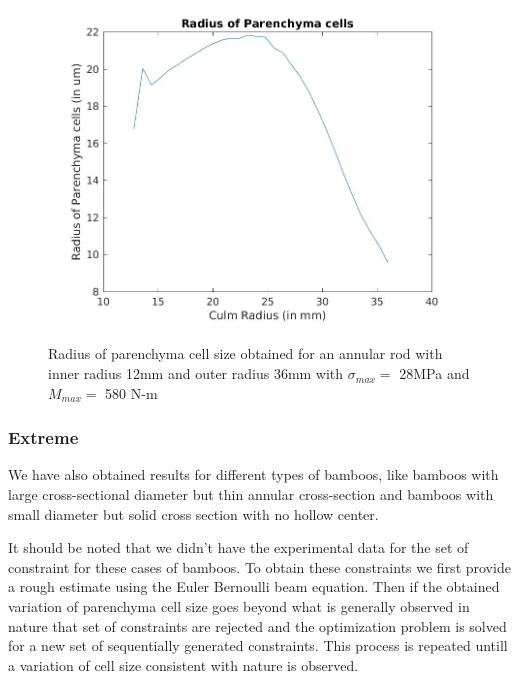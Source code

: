 \documentclass[10pt]{article}
\begin{document}
\begin{figure}[H]
\begin{center}
	\includegraphics[scale=0.4]{./Plots/normal/b77.jpg}
	\label{fig:cellsize}
	\caption{Radius of parenchyma cell size obtained for an annular rod with inner radius 12mm and outer radius 36mm with $\sigma_{max} = $ 28MPa and $M_{max} = $ 580 N-m}
\end{center}
\end{figure}

\subsubsection{Extreme}
We have also obtained results for different types of bamboos, like bamboos with large cross-sectional diameter but thin annular cross-section and bamboos with small diameter but solid cross section with no hollow center.\par
It should be noted that we didn't have the experimental data for the set of constraint for these cases of bamboos. To obtain these constraints we first provide a rough estimate using the Euler Bernoulli beam equation. Then if the obtained variation of parenchyma cell size goes beyond what is generally observed in nature that set of constraints are rejected and the optimization problem is solved for a new set of sequentially generated constraints. This process is repeated untill a variation of cell size consistent with nature is observed. 
\end{document}
